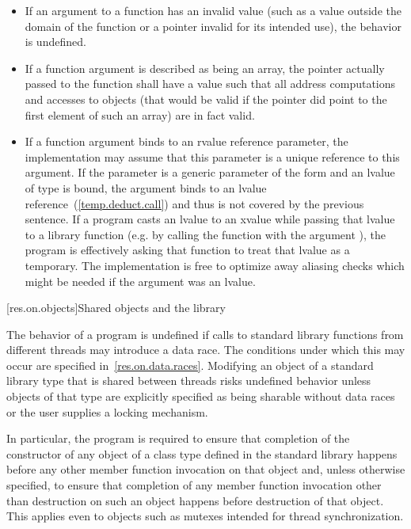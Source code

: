\begin{itemize}
\item
If an argument to a function has an invalid value (such
%
as a value outside the domain of the function or a pointer invalid for its
intended use), the behavior is undefined.
%

\item
If a function argument is described as being an array,
%
the pointer actually passed to the function shall have a value such that all
address computations and accesses to objects (that would be valid if the
pointer did point to the first element of such an array) are in fact valid.

\item
If a function argument binds to an rvalue reference parameter, the implementation may
assume that this parameter is a unique reference to this argument.
\enternote
If the parameter is a generic parameter of the form  and an lvalue of type
 is bound, the argument binds to an lvalue reference~(\ref{temp.deduct.call})
and thus is not covered by the previous sentence. \exitnote \enternote If a program casts
an lvalue to an xvalue while passing that lvalue to a library function (e.g. by calling the function
with the argument ), the program
is effectively asking that function to treat that lvalue as a temporary. The implementation
is free to optimize away aliasing checks which might be needed if the argument was
an lvalue. \exitnote
\end{itemize}

[res.on.objects]{Shared objects and the library}

\pnum
The behavior of a program is undefined if calls to standard library functions from different
threads may introduce a data race. The conditions under which this may occur are specified
in~\ref{res.on.data.races}. \enternote Modifying an object of a standard library type that is
shared between threads risks undefined behavior unless objects of that type are explicitly
specified as being sharable without data races or the user supplies a locking mechanism. \exitnote

\pnum
\enternote In particular, the program is required to ensure that completion
of the constructor of any object of a class type defined in the standard library
happens before any other member function invocation on that object and, unless
otherwise specified, to ensure that completion of any member function invocation
other than destruction on such an object happens before destruction of that object.
This applies even to objects such as mutexes intended for thread synchronization. \exitnote

